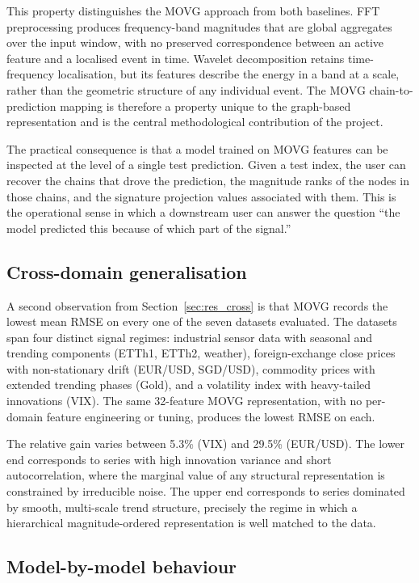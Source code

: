 \documentclass[a4paper,12pt]{article}
\begin{document}
This property distinguishes the MOVG approach from both baselines. FFT preprocessing produces frequency-band magnitudes that are global aggregates over the input window, with no preserved correspondence between an active feature and a localised event in time. Wavelet decomposition retains time-frequency localisation, but its features describe the energy in a band at a scale, rather than the geometric structure of any individual event. The MOVG chain-to-prediction mapping is therefore a property unique to the graph-based representation and is the central methodological contribution of the project.

The practical consequence is that a model trained on MOVG features can be inspected at the level of a single test prediction. Given a test index, the user can recover the chains that drove the prediction, the magnitude ranks of the nodes in those chains, and the signature projection values associated with them. This is the operational sense in which a downstream user can answer the question ``the model predicted this because of which part of the signal.''

\subsection{Cross-domain generalisation}
\label{sec:disc_generalise}

A second observation from Section~\ref{sec:res_cross} is that MOVG records the lowest mean RMSE on every one of the seven datasets evaluated. The datasets span four distinct signal regimes: industrial sensor data with seasonal and trending components (ETTh1, ETTh2, weather), foreign-exchange close prices with non-stationary drift (EUR/USD, SGD/USD), commodity prices with extended trending phases (Gold), and a volatility index with heavy-tailed innovations (VIX). The same 32-feature MOVG representation, with no per-domain feature engineering or tuning, produces the lowest RMSE on each.

The relative gain varies between 5.3\% (VIX) and 29.5\% (EUR/USD). The lower end corresponds to series with high innovation variance and short autocorrelation, where the marginal value of any structural representation is constrained by irreducible noise. The upper end corresponds to series dominated by smooth, multi-scale trend structure, precisely the regime in which a hierarchical magnitude-ordered representation is well matched to the data.

\subsection{Model-by-model behaviour}
\label{sec:disc_models}
\end{document}
